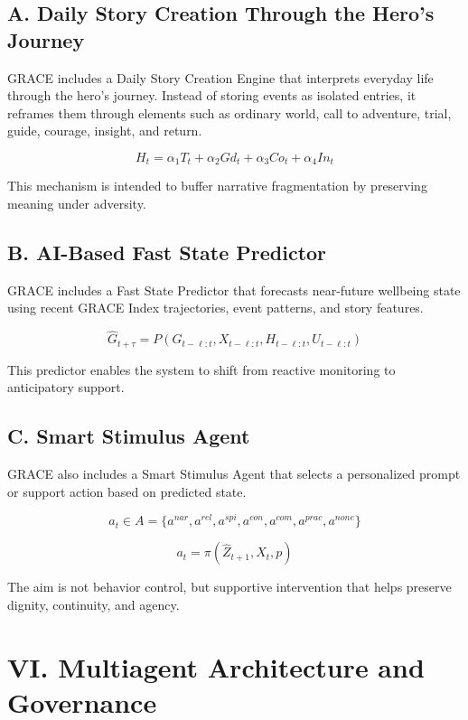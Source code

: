 \documentclass[
  journal,
]{IEEEtran}%
\newcounter{none} %
\begin{document}
\subsection{A. Daily Story Creation Through the Hero's
Journey}\label{a.-daily-story-creation-through-the-heros-journey}

GRACE includes a Daily Story Creation Engine that interprets everyday
life through the hero's journey. Instead of storing events as isolated
entries, it reframes them through elements such as ordinary world, call
to adventure, trial, guide, courage, insight, and return.

\[H_t = \alpha_1T_t + \alpha_2Gd_t + \alpha_3Co_t + \alpha_4In_t\]

This mechanism is intended to buffer narrative fragmentation by
preserving meaning under adversity.

\subsection{B. AI-Based Fast State
Predictor}\label{b.-ai-based-fast-state-predictor}

GRACE includes a Fast State Predictor that forecasts near-future
wellbeing state using recent GRACE Index trajectories, event patterns,
and story features.

\[\hat{G}_{t+\tau} = P(G_{t-\ell:t}, X_{t-\ell:t}, H_{t-\ell:t}, U_{t-\ell:t})\]

This predictor enables the system to shift from reactive monitoring to
anticipatory support.

\subsection{C. Smart Stimulus Agent}\label{c.-smart-stimulus-agent}

GRACE also includes a Smart Stimulus Agent that selects a personalized
prompt or support action based on predicted state.

\[a_t \in A = \{a^{nar}, a^{rel}, a^{spi}, a^{con}, a^{com}, a^{prac}, a^{none}\}\]

\[a_t = \pi(\hat{Z}_{t+1}, X_t, p)\]

The aim is not behavior control, but supportive intervention that helps
preserve dignity, continuity, and agency.

\section{VI. Multiagent Architecture and
Governance}\label{vi.-multiagent-architecture-and-governance}
\end{document}
